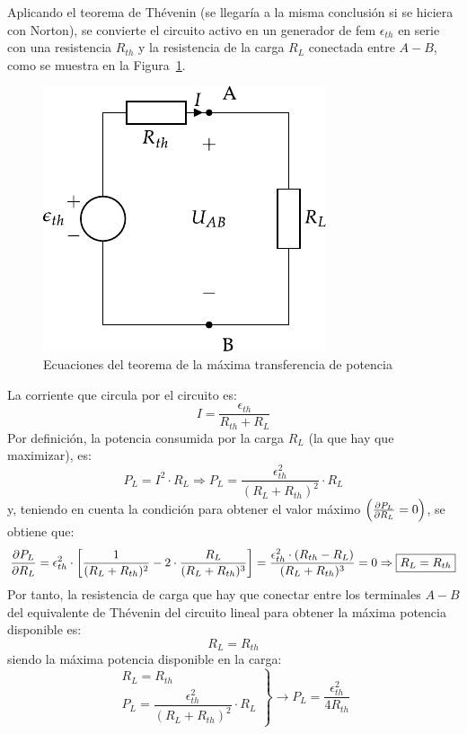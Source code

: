 \documentclass[11pt]{book} %
\begin{document}
Aplicando el teorema de Thévenin (se llegaría a la misma conclusión si se hiciera con Norton), se convierte el circuito activo en un generador de fem $\epsilon_{th}$ en serie con una resistencia ${R_{th}}$ y la resistencia de la carga ${R_L}$ conectada entre $A-B$, como se muestra en la Figura~\ref{fig.equivalenteThevenin0_cc}. 
\begin{figure}[htbp]
    \centering
    \includegraphics{../figs/thevenin_continua.pdf}
    \caption{Ecuaciones del teorema de la máxima transferencia de potencia}
    \label{fig.equivalenteThevenin0_cc}
\end{figure}

La corriente que circula por el circuito es: 
\begin{equation*}
{I} = \frac{{\epsilon}_{th}}{R_{th} + {R}_L}
\end{equation*}
Por definición, la potencia consumida por la carga $R_L$ (la que hay que maximizar), es: 
\begin{equation*}
   P_L= I^2 \cdot R_L\Rightarrow P_L = \dfrac{\epsilon_{th}^2}{(R_L+R_{th})^2} \cdot R_L
\end{equation*}
y, teniendo en cuenta la condición para obtener el valor máximo $\left(\diffp{P_L}{R_L} = 0\right)$, se obtiene que:
    \begin{equation*}%
        \diffp{P_L}{R_L} = \epsilon^2_{th} \cdot \left[\frac{1}{(R_L + R_{th})^2} - 2 \cdot \frac{R_L}{(R_L + R_{th})^3}\right]= \frac{\epsilon^2_{th} \cdot (R_{th} - R_L)}{(R_L + R_{th})^3}=0\Rightarrow \boxed{R_L = R_{th}}
    \end{equation*}
Por tanto, la resistencia de carga que hay que conectar entre los terminales $A-B$ del equivalente de Thévenin del circuito lineal para obtener la máxima potencia disponible es:
\begin{equation}
    \boxed{R_L = R_{th}}
\end{equation}
siendo la máxima potencia disponible en la carga:
\begin{equation}
  \left.
    \begin{matrix}
      R_L = R_{th}\\
      P_L = \dfrac{\epsilon_{th}^2}{{(R_L+R_{th})^2}} \cdot R_L
    \end{matrix} \right\}\rightarrow
  \boxed{P_L = \frac{\epsilon^2_{th}}{4 R_{th}}}
\end{equation}
\end{document}
